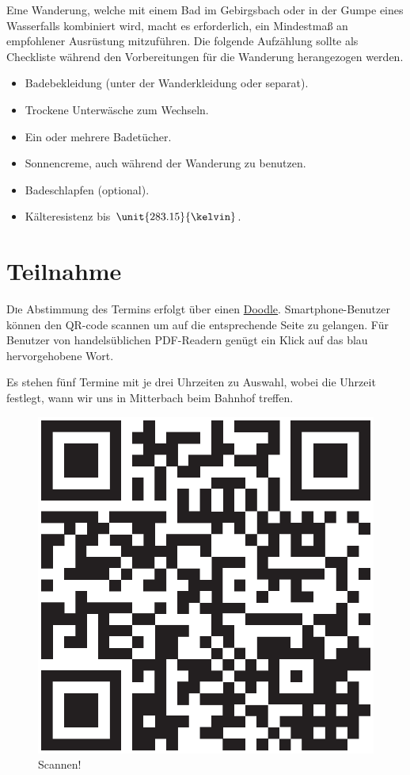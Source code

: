 \documentclass[twoside]{article}
\begin{document}
\begin{multicols}{2}
\lettrine[nindent=0em,lines=3]{E} ine Wanderung, welche mit einem Bad im Gebirgsbach oder in der Gumpe eines Wasserfalls kombiniert wird, macht es erforderlich,
ein Mindestmaß an empfohlener Ausrüstung mitzuführen. Die folgende Aufzählung sollte als Checkliste während den Vorbereitungen für die Wanderung herangezogen
werden.

\begin{itemize}
    \item[\Square] Badebekleidung (unter der Wanderkleidung oder separat).
    \item[\Square] Trockene Unterwäsche zum Wechseln.
    \item[\Square] Ein oder mehrere Badetücher.
    \item[\Square] Sonnencreme, auch während der Wanderung zu benutzen.
    \item[\Square] Badeschlapfen (optional).
    \item[\Square] Kälteresistenz bis $\unit{283.15}{\kelvin}$.
\end{itemize}


\section{Teilnahme}
\label{sec:teilnahme}

\lettrine[nindent=0em,lines=3]{D} ie Abstimmung des Termins erfolgt über einen \href{http://www.doodle.com/m6ywebgyvg6632ig}{Doodle}. Smartphone-Benutzer
können den QR-code scannen um auf die entsprechende Seite zu gelangen. Für Benutzer von handelsüblichen PDF-Readern genügt ein Klick auf das blau hervorgehobene
Wort.

Es stehen fünf Termine mit je drei Uhrzeiten zu Auswahl, wobei die Uhrzeit festlegt, wann wir uns in Mitterbach beim Bahnhof treffen.

\begin{figure}[H]
\begin{center}
  \includegraphics[width=.45\textwidth]{Figures/qr-code.eps}
\end{center}
\caption{Scannen!}
\label{fig:qr-codqr-code}
\end{figure}


\end{multicols}
\end{document}
